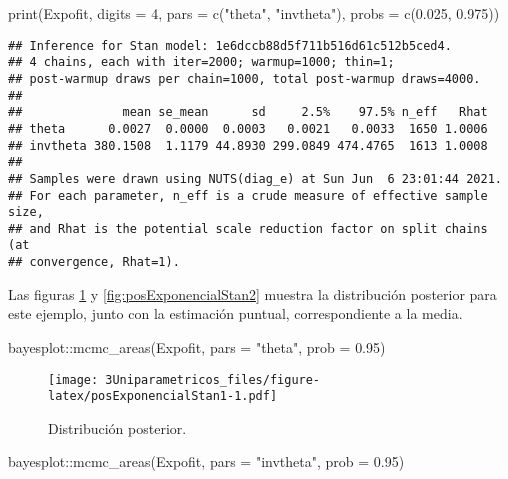\documentclass[
  10pt,
  spanish,
]{book}
\newenvironment{Shaded}{\begin{snugshade}}{\end{snugshade}}
\newcommand{\AttributeTok}[1]{\textcolor[rgb]{0.77,0.63,0.00}{#1}}
\newcommand{\DecValTok}[1]{\textcolor[rgb]{0.00,0.00,0.81}{#1}}
\newcommand{\FloatTok}[1]{\textcolor[rgb]{0.00,0.00,0.81}{#1}}
\newcommand{\FunctionTok}[1]{\textcolor[rgb]{0.00,0.00,0.00}{#1}}
\newcommand{\NormalTok}[1]{#1}
\newcommand{\SpecialCharTok}[1]{\textcolor[rgb]{0.00,0.00,0.00}{#1}}
\newcommand{\StringTok}[1]{\textcolor[rgb]{0.31,0.60,0.02}{#1}}
\theoremstyle{definition}
\theoremstyle{definition}
\theoremstyle{definition}
\theoremstyle{definition}
\theoremstyle{remark}
\begin{document}
\begin{Shaded}
\begin{Highlighting}[]
\FunctionTok{print}\NormalTok{(Expofit, }\AttributeTok{digits =} \DecValTok{4}\NormalTok{, }
      \AttributeTok{pars =} \FunctionTok{c}\NormalTok{(}\StringTok{"theta"}\NormalTok{, }\StringTok{"invtheta"}\NormalTok{),}
      \AttributeTok{probs =} \FunctionTok{c}\NormalTok{(}\FloatTok{0.025}\NormalTok{, }\FloatTok{0.975}\NormalTok{))}
\end{Highlighting}
\end{Shaded}

\begin{verbatim}
## Inference for Stan model: 1e6dccb88d5f711b516d61c512b5ced4.
## 4 chains, each with iter=2000; warmup=1000; thin=1; 
## post-warmup draws per chain=1000, total post-warmup draws=4000.
## 
##              mean se_mean      sd     2.5%    97.5% n_eff   Rhat
## theta      0.0027  0.0000  0.0003   0.0021   0.0033  1650 1.0006
## invtheta 380.1508  1.1179 44.8930 299.0849 474.4765  1613 1.0008
## 
## Samples were drawn using NUTS(diag_e) at Sun Jun  6 23:01:44 2021.
## For each parameter, n_eff is a crude measure of effective sample size,
## and Rhat is the potential scale reduction factor on split chains (at 
## convergence, Rhat=1).
\end{verbatim}

Las figuras \ref{fig:posExponencialStan1} y \ref{fig:posExponencialStan2} muestra la distribución posterior para este ejemplo, junto con la estimación puntual, correspondiente a la media.

\begin{Shaded}
\begin{Highlighting}[]
\NormalTok{bayesplot}\SpecialCharTok{::}\FunctionTok{mcmc\_areas}\NormalTok{(Expofit, }\AttributeTok{pars =} \StringTok{"theta"}\NormalTok{, }
                      \AttributeTok{prob =} \FloatTok{0.95}\NormalTok{)}
\end{Highlighting}
\end{Shaded}

\begin{figure}
\centering
\texttt{[image: 3Uniparametricos\_files/figure-latex/posExponencialStan1-1.pdf]}
\caption{\label{fig:posExponencialStan1}Distribución posterior.}
\end{figure}

\begin{Shaded}
\begin{Highlighting}[]
\NormalTok{bayesplot}\SpecialCharTok{::}\FunctionTok{mcmc\_areas}\NormalTok{(Expofit, }\AttributeTok{pars =} \StringTok{"invtheta"}\NormalTok{, }
                      \AttributeTok{prob =} \FloatTok{0.95}\NormalTok{)}
\end{Highlighting}
\end{Shaded}
\end{document}
